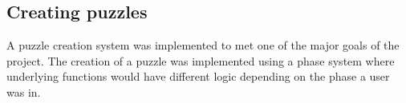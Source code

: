 \documentclass{l4proj}
\begin{document}





\subsection{Creating puzzles}
A puzzle creation system was implemented to met one of the major goals of the project. The creation of a puzzle was implemented using a phase system where underlying functions would have different logic depending on the phase a user was in. 
\end{document}
